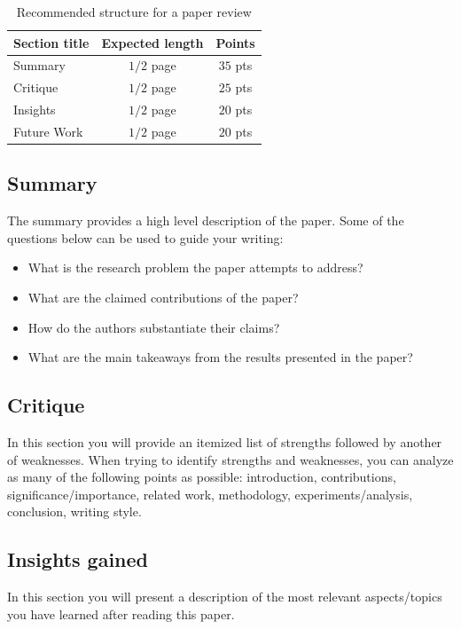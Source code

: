 \documentclass[acmsmall,nonacm]{acmart}
\begin{document}
\begin{table}[h!]
    \caption{Recommended structure for a paper review}
    \label{tab:structure}
    \begin{tabular}{lcc}
        \toprule
        Section title & Expected length & Points \\
        \midrule
        Summary & $1/2$ page & $35$ pts \\
        Critique & $1/2$ page & $25$ pts \\
        Insights & $1/2$ page & $20$ pts \\
        Future Work & $1/2$ page & $20$ pts \\
        \bottomrule
    \end{tabular}
\end{table}

\subsection{Summary}
The summary provides a high level description of the paper.  Some of the questions below can be used to guide your writing:
\begin{itemize}
    \item What is the research problem the paper attempts to address?
    \item What are the claimed contributions of the paper?
    \item How do the authors substantiate their claims?
    \item What are the main takeaways from the results presented in the paper?
\end{itemize}

\subsection{Critique}
In this section you will provide an itemized list of strengths followed by another of weaknesses.  When trying to identify strengths and weaknesses, you can analyze as many of the following points as possible: introduction, contributions, significance/importance, related work, methodology, experiments/analysis, conclusion, writing style.

\subsection{Insights gained}
In this section you will present a description of the most relevant aspects/topics you have learned after reading this paper.
\end{document}
